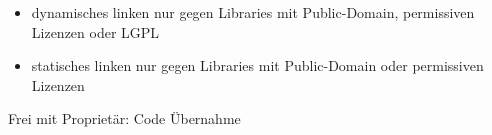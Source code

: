 \note
{
	\begin{itemize}
		\item dynamisches linken nur gegen Libraries mit Public-Domain, permissiven Lizenzen oder LGPL
		\item statisches linken nur gegen Libraries mit Public-Domain oder permissiven Lizenzen
	\end{itemize}
}

\begin{frame}{Frei mit Proprietär: Code Übernahme}
	\begin{multicols}{2}
		\begin{center}
		\end{center}
		\pagebreak
		\begin{center}
\end{center}
\end{multicols}
\end{frame}
